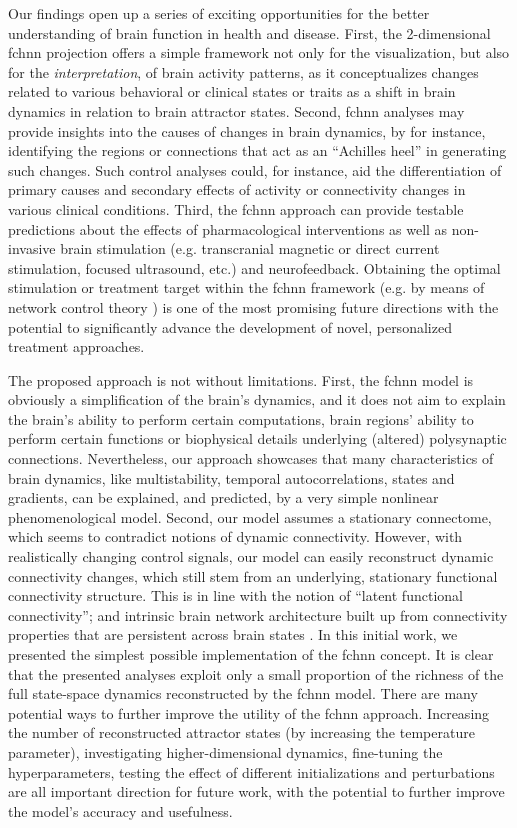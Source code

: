 \documentclass{article}
\begin{document}
Our findings open up a series of exciting opportunities for the better understanding of brain function in health and disease.
First, the 2-dimensional \acrshort{fchnn} projection offers a simple framework not only for the visualization, but also for the \textit{interpretation}, of brain activity patterns, as it conceptualizes changes related to various behavioral or clinical states or traits as a shift in brain dynamics in relation to brain attractor states.
Second, \acrshort{fchnn} analyses may provide insights into the causes of changes in brain dynamics, by for instance, identifying the regions or connections that act as an ``Achilles heel'' in generating such changes. Such control analyses could, for instance, aid the differentiation of primary causes and secondary effects of activity or connectivity changes in various clinical conditions.
Third, the \acrshort{fchnn} approach can provide testable predictions about the effects of pharmacological interventions as well as non-invasive brain stimulation (e.g. transcranial magnetic or direct current stimulation, focused ultrasound, etc.) and neurofeedback. Obtaining the optimal stimulation or treatment target within the \acrshort{fchnn} framework (e.g. by means of network control theory \citep{liu2011controllability}) is one of the most promising future directions with the potential to significantly advance the development of novel, personalized treatment approaches.

The proposed approach is not without limitations. First, the \acrshort{fchnn} model is obviously a simplification of the brain's dynamics, and it does not aim to explain the brain's ability to perform certain computations, brain regions' ability to perform certain functions or biophysical details underlying (altered) polysynaptic connections. Nevertheless, our approach showcases that many characteristics of brain dynamics, like multistability, temporal autocorrelations, states and gradients, can be explained, and predicted, by a very simple nonlinear phenomenological model.
Second, our model assumes a stationary connectome, which seems to contradict notions of dynamic connectivity. However, with realistically changing control signals, our model can easily reconstruct dynamic connectivity changes, which still stem from an underlying, stationary functional connectivity structure. This is in line with the notion of ``latent functional connectivity''; and intrinsic brain network architecture built up from connectivity properties that are persistent across brain states \cite{McCormick_2022}.
In this initial work, we presented the simplest possible implementation of the \acrshort{fchnn} concept. It is clear that the presented analyses exploit only a small proportion of the richness of the full state-space dynamics reconstructed by the \acrshort{fchnn} model.
There are many potential ways to further improve the utility of the \acrshort{fchnn} approach. Increasing the number of reconstructed attractor states (by increasing the temperature parameter), investigating higher-dimensional dynamics, fine-tuning the hyperparameters, testing the effect of different initializations and perturbations are all important direction for future work, with the potential to further improve the model's accuracy and usefulness.
\end{document}
